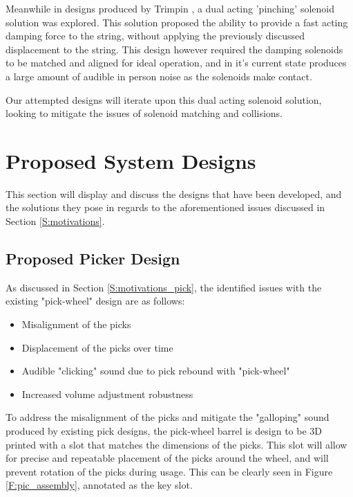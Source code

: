 \documentclass[a4paper,11pt]{article}
\begin{document}
Meanwhile in designs produced by Trimpin \cite{kapur_history_nodate}, a dual acting 'pinching' solenoid solution was explored. This solution proposed the ability to provide a fast acting damping force to the string, without applying the previously discussed displacement to the string. This design however required the damping solenoids to be matched and aligned for ideal operation, and in it's current state produces a large amount of audible in person noise as the solenoids make contact. 

Our attempted designs will iterate upon this dual acting solenoid solution, looking to mitigate the issues of solenoid matching and collisions.


\section{Proposed System Designs}

This section will display and discuss the designs that have been developed, and the solutions they pose in regards to the aforementioned issues discussed in Section \ref{S:motivations}.

\subsection{Proposed Picker Design}

As discussed in Section \ref{S:motivations_pick}, the identified issues with the existing "pick-wheel" design are as follows:

\begin{itemize}
  \item Misalignment of the picks
  \item Displacement of the picks over time
  \item Audible "clicking" sound due to pick rebound with "pick-wheel"
  \item Increased volume adjustment robustness
\end{itemize}

To address the misalignment of the picks and mitigate the "galloping" sound produced by existing pick designs, the pick-wheel barrel is design to be 3D printed with a slot that matches the dimensions of the picks. This slot will allow for precise and repeatable placement of the picks around the wheel, and will prevent rotation of the picks during usage. This can be clearly seen in Figure \ref{F:pic_assembly}, annotated as the key slot.\\
\end{document}
